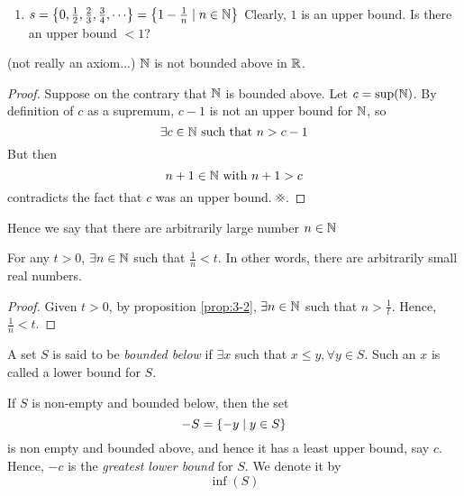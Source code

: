 \documentclass{article}
\begin{document}
\begin{eg}
\begin{enumerate}[label=(\arabic*)]
        \item $s = \crbkt{0, \frac{1}{2}, \frac{2}{3}, \frac{3}{4}, \cdots} = \crbkt{1 - \frac{1}{n} \mid n \in \N}$
        Clearly, $1$ is an upper bound. Is there an upper bound $< 1$?
    \end{enumerate}
\end{eg}

\begin{nprop}\label{prop:3-2}
    (not really an axiom...) $\mathbb{N}$ is not bounded above in $\mathbb{R}$.
\end{nprop}
\begin{proof}
    Suppose on the contrary that $\mathbb{N}$ is bounded above.
    Let $c = \sup(\mathbb{N})$.
    By definition of $c$ as a supremum, $c - 1$ is not an upper bound for $\mathbb{N}$,
    so
    \[
        \exists c \in \mathbb{N} \text{ such that } n > c - 1  
    \]
    But then
    \[
        n + 1 \in \mathbb{N} \text{ with } n + 1 > c  
    \]
    contradicts the fact that $c$ was an upper bound. $\contradiction$.
\end{proof}
\begin{remark}
    Hence we say that there are arbitrarily large number $n \in \mathbb{N}$
\end{remark}

\begin{ncor}\label{cor:3-3}
    For any $t > 0$, $\exists n \in \mathbb{N}$ such that $\frac{1}{n} < t$.
    In other words, there are arbitrarily small real numbers.
\end{ncor}
\begin{proof}
    Given $t > 0$, by proposition \ref{prop:3-2}, $\exists n \in \mathbb{N}$ such that $n > \frac{1}{t}$.
    Hence, $\frac{1}{n} < t$.
\end{proof}

\begin{defi}
    A set $S$ is said to be \emph{bounded below} if $\exists x$ such that $x \leq y, \forall y \in S$.
    Such an $x$ is called a lower bound for $S$. 
\end{defi}

\begin{defi}
    If $S$ is non-empty and bounded below, then the set 
    \[
        -S = \left\{ -y \mid y \in S \right\}  
    \]
    is non empty and bounded above, and hence it has a least upper bound, say $c$.
    Hence, $-c$ is the \emph{greatest lower bound} for $S$.
    We denote it by 
    \[
        \inf (S)  
    \]
\end{defi}
\end{document}
